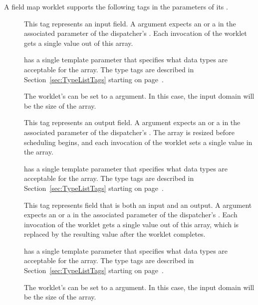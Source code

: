 A field map worklet supports the following tags in the parameters of its
\controlsignature.

\begin{description}
\item[] This tag represents an input field. A
   argument expects an  or a
   in the associated parameter of the
  dispatcher's . Each invocation of the worklet gets a
  single value out of this array.

   has a single template parameter that specifies what data
  types are acceptable for the array. The type tags are described in
  Section~\ref{sec:TypeListTags} starting on
  page~\pageref{TypeTagList}.

  The worklet's  can be set to a  argument. In
  this case, the input domain will be the size of the array.

\item[] This tag represents an output field. A
   argument expects an  or a
   in the associated parameter of the
  dispatcher's . The array is resized before scheduling
  begins, and each invocation of the worklet sets a single value in the
  array.

   has a single template parameter that specifies what
  data types are acceptable for the array. The type tags are described in
  Section~\ref{sec:TypeListTags} starting on
  page~\pageref{TypeTagList}.

\item[] This tag represents field that is both an input
  and an output. A  argument expects an
   or a  in
  the associated parameter of the dispatcher's . Each
  invocation of the worklet gets a single value out of this array, which is
  replaced by the resulting value after the worklet completes.

   has a single template parameter that specifies what
  data types are acceptable for the array. The type tags are described in
  Section~\ref{sec:TypeListTags} starting on
  page~\pageref{TypeTagList}.

  The worklet's  can be set to a  argument. In
  this case, the input domain will be the size of the array.

  \commoncontrolsignaturetags
\end{description}

